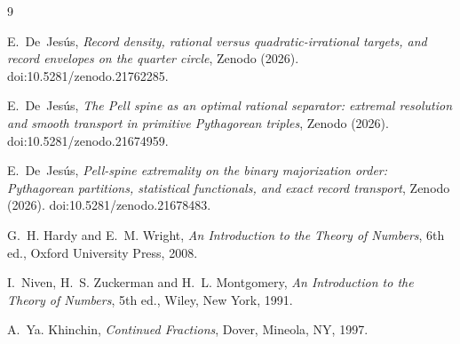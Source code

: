\documentclass[11pt]{article}
\theoremstyle{definition}
\theoremstyle{remark}
\begin{document}
\begin{thebibliography}{9}

E.~De~Jes\'us, \emph{Record density, rational versus quadratic-irrational targets, and record envelopes on the quarter circle}, Zenodo (2026). doi:10.5281/zenodo.21762285.

E.~De~Jes\'us, \emph{The Pell spine as an optimal rational separator: extremal resolution and smooth transport in primitive Pythagorean triples}, Zenodo (2026). doi:10.5281/zenodo.21674959.

E.~De~Jes\'us, \emph{Pell-spine extremality on the binary majorization order: Pythagorean partitions, statistical functionals, and exact record transport}, Zenodo (2026). doi:10.5281/zenodo.21678483.

G.~H. Hardy and E.~M. Wright, \emph{An Introduction to the Theory of Numbers}, 6th ed., Oxford University Press, 2008.

I.~Niven, H.~S. Zuckerman and H.~L. Montgomery, \emph{An Introduction to the Theory of Numbers}, 5th ed., Wiley, New York, 1991.

A.~Ya. Khinchin, \emph{Continued Fractions}, Dover, Mineola, NY, 1997.

\end{thebibliography}
\end{document}
